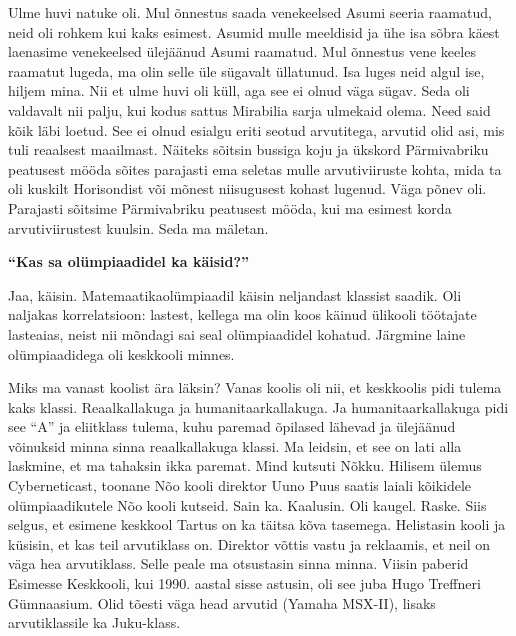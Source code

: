 Ulme huvi natuke oli. Mul õnnestus saada venekeelsed Asumi seeria raamatud, neid oli rohkem kui kaks esimest. Asumid mulle meeldisid ja ühe isa sõbra käest laenasime venekeelsed ülejäänud Asumi raamatud. Mul õnnestus vene keeles raamatut lugeda, ma olin selle üle sügavalt üllatunud. Isa luges neid algul ise, hiljem mina. Nii et ulme huvi oli küll, aga see ei olnud väga sügav. Seda oli valdavalt nii palju, kui kodus sattus Mirabilia sarja ulmekaid olema. Need said kõik läbi loetud. See ei olnud esialgu eriti seotud arvutitega, arvutid olid asi, mis tuli reaalsest maailmast. Näiteks sõitsin bussiga koju ja ükskord Pärmivabriku peatusest mööda sõites parajasti ema seletas mulle arvutiviiruste kohta, mida ta oli kuskilt Horisondist või mõnest niisugusest kohast lugenud. Väga põnev oli. Parajasti sõitsime Pärmivabriku peatusest mööda, kui ma esimest korda arvutiviirustest kuulsin. Seda ma mäletan. 

\textbf{\enquote{Kas sa olümpiaadidel ka käisid?}}

Jaa, käisin. Matemaatikaolümpiaadil käisin neljandast klassist saadik. Oli naljakas korrelatsioon: lastest, kellega ma olin koos käinud ülikooli töötajate lasteaias, neist nii mõndagi sai seal olümpiaadidel kohatud. Järgmine laine olümpiaadidega oli keskkooli minnes. 

Miks ma vanast koolist ära läksin? Vanas koolis oli nii, et keskkoolis pidi tulema kaks klassi. Reaalkallakuga ja humanitaarkallakuga. Ja humanitaarkallakuga pidi see \enquote{A} ja eliitklass tulema, kuhu paremad õpilased lähevad ja ülejäänud võinuksid minna sinna reaalkallakuga klassi. Ma leidsin, et see on lati alla laskmine, et ma tahaksin ikka paremat. Mind kutsuti Nõkku. Hilisem ülemus Cyberneticast, toonane Nõo kooli direktor Uuno Puus saatis laiali kõikidele olümpiaadikutele Nõo kooli kutseid. Sain ka. Kaalusin. Oli kaugel. Raske. Siis selgus, et esimene keskkool Tartus on ka täitsa kõva tasemega. Helistasin kooli ja küsisin, et kas teil arvutiklass on. Direktor võttis vastu ja reklaamis, et neil on väga hea arvutiklass. Selle peale ma otsustasin sinna minna. Viisin paberid Esimesse Keskkooli, kui 1990. aastal sisse astusin, oli see juba Hugo Treffneri Gümnaasium. Olid tõesti väga head arvutid (Yamaha MSX-II), lisaks arvutiklassile ka Juku-klass. 

